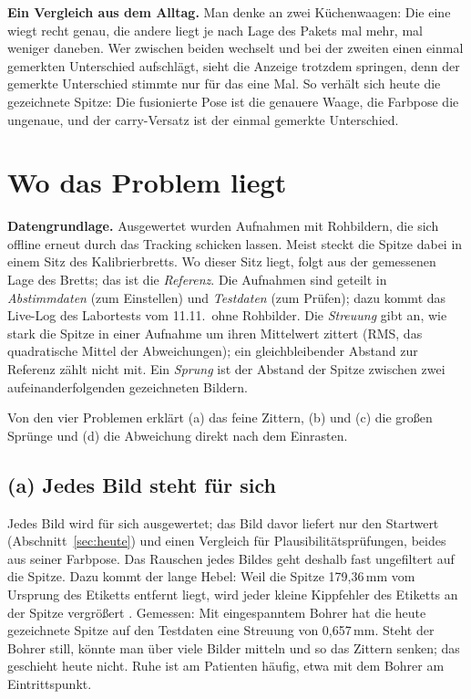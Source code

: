 \documentclass[11pt,a4paper,fleqn]{article}
\begin{document}
\textbf{Ein Vergleich aus dem Alltag.} Man denke an zwei Küchenwaagen: Die eine wiegt recht genau, die andere
liegt je nach Lage des Pakets mal mehr, mal weniger daneben. Wer zwischen beiden wechselt und bei der zweiten einen
einmal gemerkten Unterschied aufschlägt, sieht die Anzeige trotzdem springen, denn der gemerkte Unterschied stimmte
nur für das eine Mal. So verhält sich heute die gezeichnete Spitze: Die fusionierte Pose ist die genauere Waage,
die Farbpose die ungenaue, und der carry-Versatz ist der einmal gemerkte Unterschied.

\section{Wo das Problem liegt}
\label{sec:problem}

\textbf{Datengrundlage.} Ausgewertet wurden Aufnahmen mit Rohbildern, die sich offline erneut durch das Tracking
schicken lassen. Meist steckt die Spitze dabei in einem Sitz des Kalibrierbretts. Wo dieser Sitz liegt, folgt aus
der gemessenen Lage des Bretts; das ist die \emph{Referenz}. Die Aufnahmen sind geteilt in \emph{Abstimmdaten} (zum
Einstellen) und \emph{Testdaten} (zum Prüfen); dazu kommt das Live-Log des Labortests vom 11.11.\ ohne Rohbilder.
Die \emph{Streuung} gibt an, wie stark die Spitze in einer Aufnahme um ihren Mittelwert zittert (RMS, das
quadratische Mittel der Abweichungen); ein gleichbleibender Abstand zur Referenz zählt nicht mit. Ein
\emph{Sprung} ist der Abstand der Spitze zwischen zwei aufeinanderfolgenden gezeichneten Bildern.

Von den vier Problemen erklärt (a) das feine Zittern, (b) und (c) die großen Sprünge und (d) die Abweichung
direkt nach dem Einrasten.

\subsection*{(a) Jedes Bild steht für sich}

Jedes Bild wird für sich ausgewertet; das Bild davor liefert nur den Startwert (Abschnitt~\ref{sec:heute}) und
einen Vergleich für Plausibilitätsprüfungen, beides aus seiner Farbpose. Das Rauschen jedes Bildes geht deshalb fast
ungefiltert auf die Spitze. Dazu kommt der
lange Hebel: Weil die Spitze 179,36\,mm vom Ursprung des Etiketts entfernt liegt, wird jeder kleine Kippfehler des
Etiketts an der Spitze vergrößert \cite[S.~535, 543]{west2004designing}. Gemessen: Mit eingespanntem Bohrer hat
die heute gezeichnete Spitze auf den Testdaten eine Streuung von 0,657\,mm. Steht der Bohrer still, könnte man über
viele Bilder mitteln und so das Zittern senken; das geschieht heute nicht. Ruhe ist am Patienten häufig, etwa mit
dem Bohrer am Eintrittspunkt.
\end{document}
